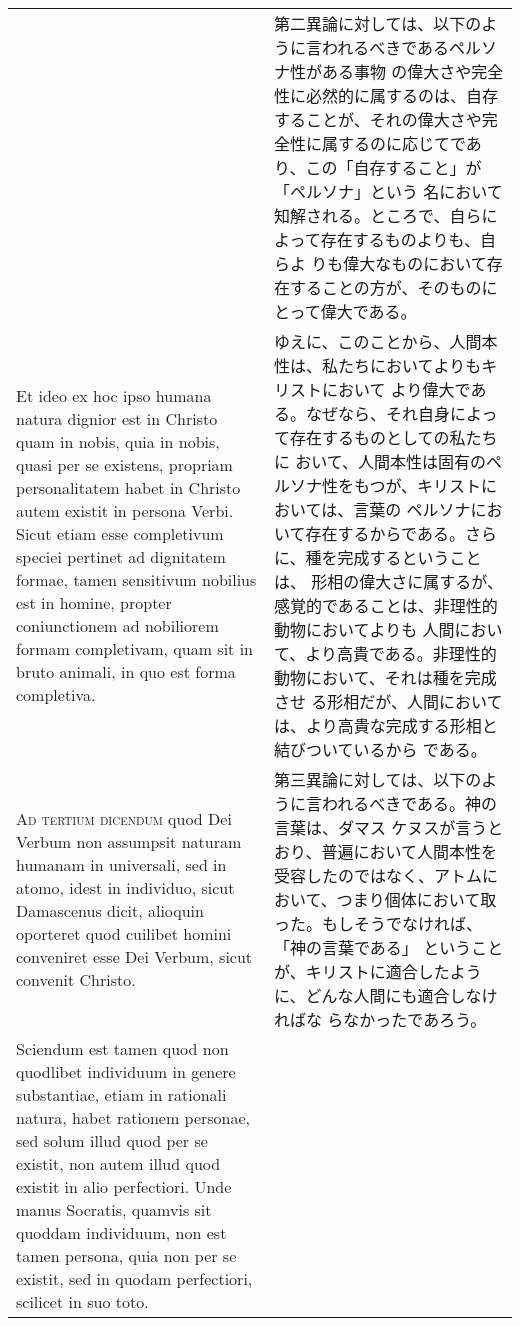 \documentclass[10pt]{jsarticle} %
\begin{document}
\begin{longtable}{p{21em}p{21em}}
&

第二異論に対しては、以下のように言われるべきであるペルソナ性がある事物
の偉大さや完全性に必然的に属するのは、自存することが、それの偉大さや完
全性に属するのに応じてであり、この「自存すること」が「ペルソナ」という
名において知解される。ところで、自らによって存在するものよりも、自らよ
りも偉大なものにおいて存在することの方が、そのものにとって偉大である。


\\


Et ideo ex hoc ipso humana natura dignior est in Christo quam in
nobis, quia in nobis, quasi per se existens, propriam personalitatem
habet in Christo autem existit in persona Verbi. Sicut etiam esse
completivum speciei pertinet ad dignitatem formae, tamen sensitivum
nobilius est in homine, propter coniunctionem ad nobiliorem formam
completivam, quam sit in bruto animali, in quo est forma completiva.


&

ゆえに、このことから、人間本性は、私たちにおいてよりもキリストにおいて
より偉大である。なぜなら、それ自身によって存在するものとしての私たちに
おいて、人間本性は固有のペルソナ性をもつが、キリストにおいては、言葉の
ペルソナにおいて存在するからである。さらに、種を完成するということは、
形相の偉大さに属するが、感覚的であることは、非理性的動物においてよりも
人間において、より高貴である。非理性的動物において、それは種を完成させ
る形相だが、人間においては、より高貴な完成する形相と結びついているから
である。


\\



{\scshape Ad tertium dicendum} quod Dei Verbum non assumpsit naturam
humanam in universali, sed in atomo, idest in individuo, sicut
Damascenus dicit, alioquin oporteret quod cuilibet homini conveniret
esse Dei Verbum, sicut convenit Christo.



&

第三異論に対しては、以下のように言われるべきである。神の言葉は、ダマス
ケヌスが言うとおり、普遍において人間本性を受容したのではなく、アトムに
おいて、つまり個体において取った。もしそうでなければ、「神の言葉である」
ということが、キリストに適合したように、どんな人間にも適合しなければな
らなかったであろう。


\\


Sciendum est tamen quod non quodlibet individuum in genere
substantiae, etiam in rationali natura, habet rationem personae, sed
solum illud quod per se existit, non autem illud quod existit in alio
perfectiori. Unde manus Socratis, quamvis sit quoddam individuum, non
est tamen persona, quia non per se existit, sed in quodam perfectiori,
scilicet in suo toto.




\end{longtable}
\end{document}
